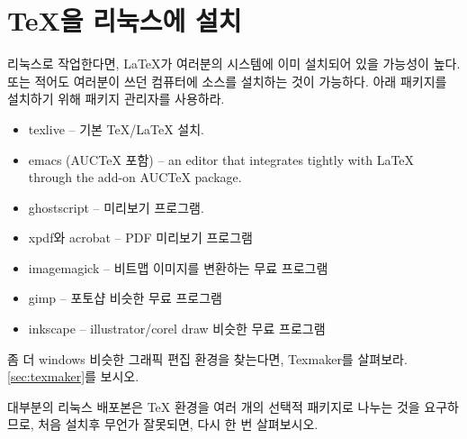 \section{\TeX{}을 리눅스에 설치}

리눅스로 작업한다면, \LaTeX{}가 여러분의 시스템에 이미 설치되어 있을 가능성이 높다.
또는 적어도 여러분이 쓰던 컴퓨터에 소스를 설치하는 것이 가능하다.
아래 패키지를 설치하기 위해 패키지 관리자를 사용하라.

\begin{itemize}
\item texlive -- 기본 \TeX{}/\LaTeX{} 설치.
\item emacs (AUCTeX 포함) -- an editor that integrates tightly with \LaTeX{} through the add-on AUCTeX package.
\item ghostscript --  \PSi{} 미리보기 프로그램.
\item xpdf와 acrobat -- PDF 미리보기 프로그램
\item imagemagick -- 비트맵 이미지를 변환하는 무료 프로그램
\item gimp -- 포토샵  비슷한 무료 프로그램
\item inkscape -- illustrator/corel draw 비슷한 무료 프로그램
\end{itemize}

좀 더 windows 비슷한 그래픽 편집 환경을 찾는다면,
Texmaker를 살펴보라. \ref{sec:texmaker}를 보시오.

대부분의 리눅스 배포본은  \TeX{} 환경을 
여러 개의 선택적 패키지로 나누는 것을 요구하므로, 처음 설치후 무언가 잘못되면,
다시 한 번 살펴보시오.

